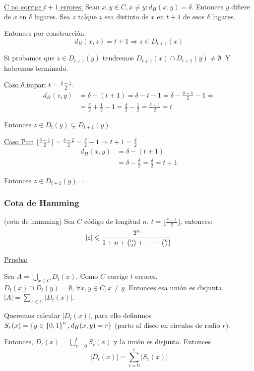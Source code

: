 \documentclass[12pt,a4paper]{article}
\begin{document}
\underline{C no corrige $t+1$ errores:} Sean $x,y\in C, x\neq y: d_{H}(x,y) = \delta$. 
Entonces $y$ difiere de $x$ en $\delta$ lugares. Sea $z$ talque $z$ sea distinto de $x$ 
en $t+1$ de esos $\delta$ lugares.
\medskip

Entonces por construcción:
$$d_{H}(x,z) = t+1 \Rightarrow z\in D_{t+1}(x)$$

Si probamos que $z\in D_{t+1}(y)$ tendremos $D_{t+1}(x) \cap D_{t+1}(y) \neq \emptyset$.
Y habremos terminado.
\medskip

\underline{Caso $\delta$ impar:} $t = \frac{\delta -1}{2}$.
\begin{align*}
    d_{H}(z,y) &= \delta - (t+1) = \delta - t - 1 = \delta - \frac{\delta -1}{2} -1 =\\
    &= \frac{\delta}{2} + \frac{1}{2} -1 = \frac{\delta}{2} - \frac{1}{2} = \frac{\delta -1}{2} = t
\end{align*}

Entonces $z \in D_{t}(y) \subsetneq D_{t+1}(y)$.
\medskip

\underline{Caso Par:} $\lfloor \frac{\delta -1}{2} \rfloor = \frac{\delta -2}{2} = \frac{\delta}{2}-1 \Rightarrow t + 1 = \frac{\delta}{2}$
\begin{align*}
    d_{H}(x,y) &= \delta - (t+1)\\
    &= \delta - \frac{\delta}{2} = \frac{\delta}{2} = t+1
\end{align*}

Entonces $z\in D_{t+1}(y)$. $\square$

\subsubsection{Cota de Hamming}
\begin{teorema} (cota de hamming) Sea $C$ código de longitud $n$, $t = \lfloor \frac{\delta -1}{2} \rfloor$, entonces:
    $$|c| \leqslant \frac{2^{n}}{1+n+ \binom{n}{2} + \cdots + \binom{n}{t}}$$
\end{teorema}
\underline{Prueba:}

Sea $A = \bigcup_{x\in C} D_{t}(x)$. Como $C$ corrige $t$ errores, 
$D_{t}(x) \cap D_{t}(y) = \emptyset,\, \forall x,y\in C, x\neq y$. Entonces esa 
unión es disjunta $|A| = \sum_{x\in C} |D_{t}(x)|$.
\medskip

Queremos calcular $|D_{t}(x)|$, para ello definimos $S_{r}(x) = \left\lbrace y\in \left\lbrace 0,1 \right\rbrace^{n}, d_{H}(x,y)=r \right\rbrace$ 
(parto al disco en circulos de radio $r$).
\medskip

Entonces, $D_{t}(x) = \bigcup_{r=0}^{t} S_{r}(x)$ y la unión es disjunta. Entonces
$$|D_{t}(x)| = \sum_{r=0}^{t} |S_{r}(x)|$$
\end{document}
